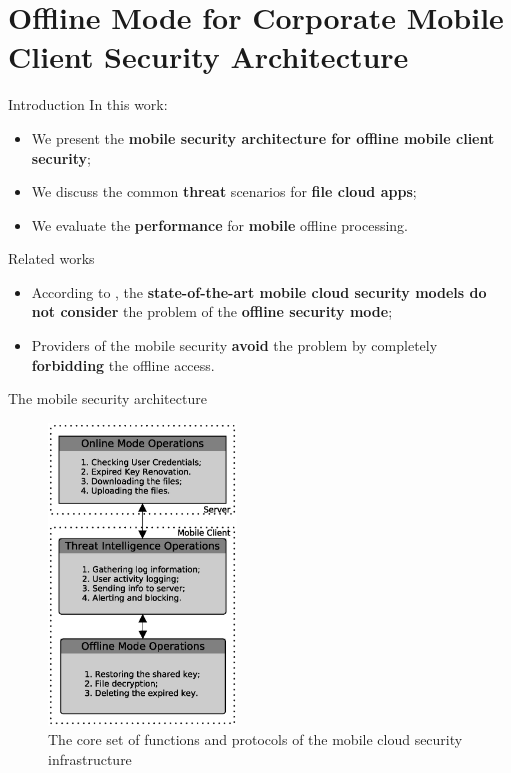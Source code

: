 \documentclass[newPxFont, numfooter, sectionpages]{beamer}
\begin{document}
\section{Offline Mode for Corporate Mobile Client Security Architecture}
\label{Blocks}
\begin{frame}[c]{Introduction}
	In this work:
	\begin{itemize}
		\item We present the \textbf{mobile security architecture for offline mobile client security};
		\item We discuss the common \textbf{threat} scenarios for \textbf{file cloud apps};
		\item We evaluate the \textbf{performance} for \textbf{mobile} offline processing.
	\end{itemize}
\end{frame}
\begin{frame}[c]{Related works}
	
	\begin{itemize}
		\item According to \cite{khan2013towards, khan2015cloud}, the \textbf{state-of-the-art mobile cloud security models do not consider} the problem of the \textbf{offline security mode};
		\item Providers of the mobile security \textbf{avoid} the problem by completely \textbf{forbidding} the offline access.
	\end{itemize}
	
\end{frame}
\begin{frame}[c]{The mobile security architecture}
	
	\begin{figure}[h!]
		\centering
		\includegraphics[width=5cm]{../figures/fig01.eps}
		\caption{The core set of functions and protocols of the mobile cloud security infrastructure}
		\label{fig:3_01}
	\end{figure}
	
\end{frame}
\end{document}
